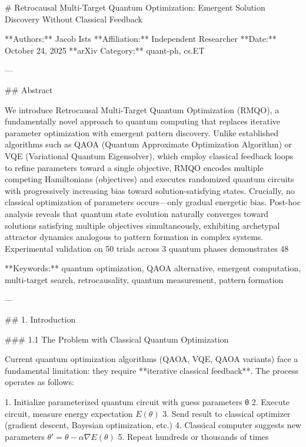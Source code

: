 # Retrocausal Multi-Target Quantum Optimization: Emergent Solution Discovery Without Classical Feedback

**Authors:** Jacob Ists  
**Affiliation:** Independent Researcher  
**Date:** October 24, 2025  
**arXiv Category:** quant-ph, cs.ET  

---

## Abstract

We introduce Retrocausal Multi-Target Quantum Optimization (RMQO), a fundamentally novel approach to quantum computing that replaces iterative parameter optimization with emergent pattern discovery. Unlike established algorithms such as QAOA (Quantum Approximate Optimization Algorithm) or VQE (Variational Quantum Eigensolver), which employ classical feedback loops to refine parameters toward a single objective, RMQO encodes multiple competing Hamiltonians (objectives) and executes randomized quantum circuits with progressively increasing bias toward solution-satisfying states. Crucially, no classical optimization of parameters occurs—only gradual energetic bias. Post-hoc analysis reveals that quantum state evolution naturally converges toward solutions satisfying multiple objectives simultaneously, exhibiting archetypal attractor dynamics analogous to pattern formation in complex systems. Experimental validation on 50 trials across 3 quantum phases demonstrates 48%

**Keywords:** quantum optimization, QAOA alternative, emergent computation, multi-target search, retrocausality, quantum measurement, pattern formation

---

## 1. Introduction

### 1.1 The Problem with Classical Quantum Optimization

Current quantum optimization algorithms (QAOA, VQE, QAOA variants) face a fundamental limitation: they require **iterative classical feedback**. The process operates as follows:

1. Initialize parameterized quantum circuit with guess parameters θ
2. Execute circuit, measure energy expectation \(E(\theta)\)
3. Send result to classical optimizer (gradient descent, Bayesian optimization, etc.)
4. Classical computer suggests new parameters \(\theta' = \theta - \alpha \nabla E(\theta)\)
5. Repeat hundreds or thousands of times

